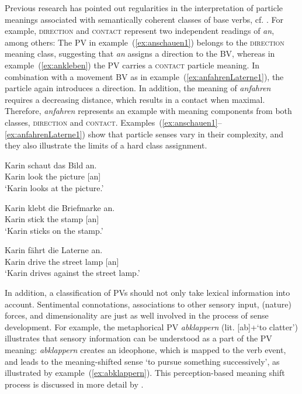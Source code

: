 \documentclass[output=paper]{langsci/langscibook}
\begin{document}
Previous research has pointed out regularities in the interpretation
of particle meanings associated with semantically coherent classes of
base verbs,
cf. \cite{Stiebels:96,Lechler/Rossdeutscher:09,Kliche:11,Springorum:11}.
For example, \textsc{direction} and \textsc{contact} represent two
independent readings of \textit{an}, among others: The PV in
example~(\ref{ex:anschauen1}) belongs to the \textsc{direction}
meaning class, suggesting that \textit{an} assigns a direction to the
BV, whereas in example~(\ref{ex:ankleben}) the PV carries a
\textsc{contact} particle meaning. In combination with a movement BV
as in example~(\ref{ex:anfahrenLaterne1}), the particle again
introduces a direction. In addition, the meaning of \textit{anfahren}
requires a decreasing distance, which results in a contact when
maximal. Therefore, \textit{anfahren} represents an example with
meaning components from both classes, \textsc{direction} and
\textsc{contact}. Examples~(\ref{ex:anschauen1}--\ref{ex:anfahrenLaterne1})
show that particle senses vary in their complexity, and they also
illustrate the limits of a hard class assignment.

\ea\label{ex:anschauen1}
\gll Karin schaut das Bild an.\\
Karin look the picture [an]\\
\glt `Karin looks at the picture.'

\ex\label{ex:ankleben}
\gll Karin klebt die Briefmarke an.\\
Karin stick the stamp [an]\\
\glt `Karin sticks on the stamp.'

\ex\label{ex:anfahrenLaterne1}
\gll Karin fährt die Laterne an.\\
Karin drive the {street lamp} [an]\\
\glt `Karin drives against the street lamp.'
\z

In addition, a classification of PVs should not only take lexical
information into account. Sentimental connotations, associations to
other sensory input, (nature) forces, and dimensionality are just as
well involved in the process of sense development. For example, the
metaphorical PV \textit{abklappern} (lit. [ab]+`to clatter')
illustrates that sensory information can be understood as a part of
the PV meaning: \textit{abklappern} creates an ideophone, which is
mapped to the verb event, and leads to the meaning-shifted sense `to
pursue something successively', as illustrated by
example~(\ref{ex:abklappern}). This perception-based meaning shift
process is discussed in more detail by \cite{SpringorumEtAl:13}.
\end{document}
